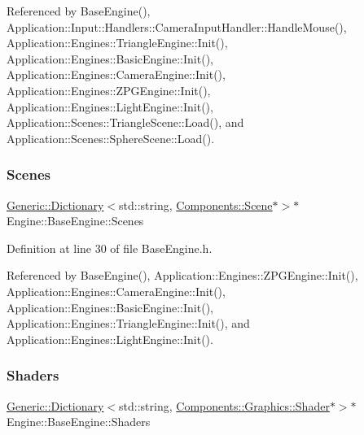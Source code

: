 Referenced by Base\+Engine(), Application\+::\+Input\+::\+Handlers\+::\+Camera\+Input\+Handler\+::\+Handle\+Mouse(), Application\+::\+Engines\+::\+Triangle\+Engine\+::\+Init(), Application\+::\+Engines\+::\+Basic\+Engine\+::\+Init(), Application\+::\+Engines\+::\+Camera\+Engine\+::\+Init(), Application\+::\+Engines\+::\+Z\+P\+G\+Engine\+::\+Init(), Application\+::\+Engines\+::\+Light\+Engine\+::\+Init(), Application\+::\+Scenes\+::\+Triangle\+Scene\+::\+Load(), and Application\+::\+Scenes\+::\+Sphere\+Scene\+::\+Load().

\mbox{\label{classEngine_1_1BaseEngine_afd02af3c2fbe9bb734db014dec06585a}} 
\subsubsection{\texorpdfstring{Scenes}{Scenes}}
{\footnotesize\ttfamily \mbox{\hyperlink{classGeneric_1_1Dictionary}{Generic\+::\+Dictionary}}$<$std\+::string, \mbox{\hyperlink{classEngine_1_1Components_1_1Scene}{Components\+::\+Scene}}$\ast$$>$$\ast$ Engine\+::\+Base\+Engine\+::\+Scenes}



Definition at line 30 of file Base\+Engine.\+h.



Referenced by Base\+Engine(), Application\+::\+Engines\+::\+Z\+P\+G\+Engine\+::\+Init(), Application\+::\+Engines\+::\+Camera\+Engine\+::\+Init(), Application\+::\+Engines\+::\+Basic\+Engine\+::\+Init(), Application\+::\+Engines\+::\+Triangle\+Engine\+::\+Init(), and Application\+::\+Engines\+::\+Light\+Engine\+::\+Init().

\mbox{\label{classEngine_1_1BaseEngine_a2582dee3f73da82bb422b43317b85e3b}} 
\subsubsection{\texorpdfstring{Shaders}{Shaders}}
{\footnotesize\ttfamily \mbox{\hyperlink{classGeneric_1_1Dictionary}{Generic\+::\+Dictionary}}$<$std\+::string, \mbox{\hyperlink{classEngine_1_1Components_1_1Graphics_1_1Shader}{Components\+::\+Graphics\+::\+Shader}}$\ast$$>$$\ast$ Engine\+::\+Base\+Engine\+::\+Shaders}



